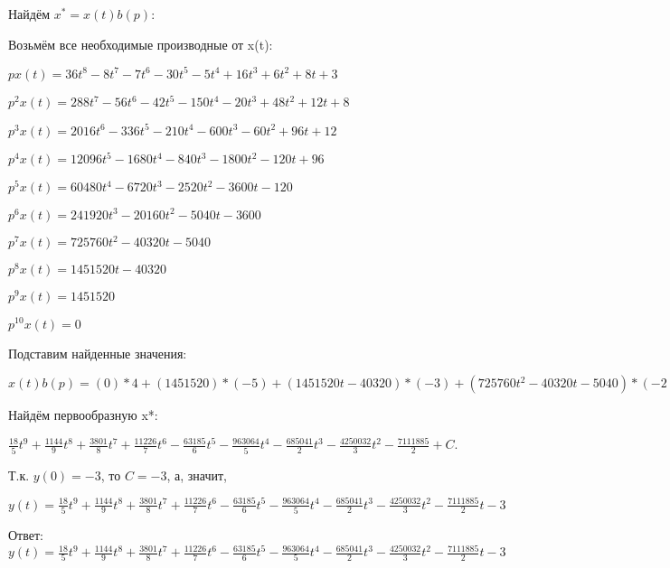 \documentclass{article}
\begin{document}
{{{{{{Найдём $x^*=x(t)b(p)$:

Возьмём все необходимые производные от x(t):

$px(t)=36t^{8}-8t^{7}-7t^{6}-30t^{5}-5t^{4}+16t^{3}+6t^{2}+8t+3$

$p^2x(t)=288t^{7}-56t^{6}-42t^{5}-150t^{4}-20t^{3}+48t^{2}+12t+8$

$p^3x(t)=2016t^{6}-336t^{5}-210t^{4}-600t^{3}-60t^{2}+96t+12$

$p^4x(t)=12096t^{5}-1680t^{4}-840t^{3}-1800t^{2}-120t+96$

$p^5x(t)=60480t^{4}-6720t^{3}-2520t^{2}-3600t-120$

$p^6x(t)=241920t^{3}-20160t^{2}-5040t-3600$

$p^7x(t)=725760t^{2}-40320t-5040$

$p^8x(t)=1451520t-40320$

$p^9x(t)=1451520$

$p^10x(t)=0$

Подставим найденные значения:

$x(t)b(p) = (0)*4+(1451520)*(-5)+(1451520t-40320)*(-3)+(725760t^{2}-40320t-5040)*(-2)+(241920t^{3}-20160t^{2}-5040t-3600)*(-4)+(60480t^{4}-6720t^{3}-2520t^{2}-3600t-120)*(-1)+(12096t^{5}-1680t^{4}-840t^{3}-1800t^{2}-120t+96)*1+(2016t^{6}-336t^{5}-210t^{4}-600t^{3}-60t^{2}+96t+12)*2+(288t^{7}-56t^{6}-42t^{5}-150t^{4}-20t^{3}+48t^{2}+12t+8)*4+(36t^{8}-8t^{7}-7t^{6}-30t^{5}-5t^{4}+16t^{3}+6t^{2}+8t+3)*(-2)+(36t^{8}-8t^{7}-7t^{6}-30t^{5}-5t^{4}+16t^{3}+6t^{2}+8t+3)*3=36t^{8}+1144t^{7}+3801t^{6}+11226t^{5}-63185t^{4}-963064t^{3}-1370082t^{2}-4250032t$





Найдём первообразную x*:

$\frac{18}{5}t^{9}+\frac{1144}{9}t^{8}+\frac{3801}{8}t^{7}+\frac{11226}{7}t^{6}-\frac{63185}{6}t^{5}-\frac{963064}{5}t^{4}-\frac{685041}{2}t^{3}-\frac{4250032}{3}t^{2}-\frac{7111885}{2}+C.$

Т.к. $y(0)=-3$, то $C=-3$, а, значит, 

$y(t)=\frac{18}{5}t^{9}+\frac{1144}{9}t^{8}+\frac{3801}{8}t^{7}+\frac{11226}{7}t^{6}-\frac{63185}{6}t^{5}-\frac{963064}{5}t^{4}-\frac{685041}{2}t^{3}-\frac{4250032}{3}t^{2}-\frac{7111885}{2}t-3$

Ответ: $y(t) = \frac{18}{5}t^{9}+\frac{1144}{9}t^{8}+\frac{3801}{8}t^{7}+\frac{11226}{7}t^{6}-\frac{63185}{6}t^{5}-\frac{963064}{5}t^{4}-\frac{685041}{2}t^{3}-\frac{4250032}{3}t^{2}-\frac{7111885}{2}t-3$

}}}}}}
\end{document}

